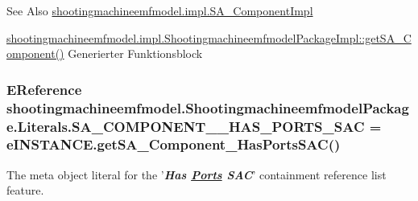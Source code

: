 \begin{DoxySeeAlso}{See Also}
\hyperlink{classshootingmachineemfmodel_1_1impl_1_1_s_a___component_impl}{shootingmachineemfmodel.\-impl.\-S\-A\-\_\-\-Component\-Impl} 

\hyperlink{classshootingmachineemfmodel_1_1impl_1_1_shootingmachineemfmodel_package_impl_a8ca2d4f6946a882d7676eef21e132f62}{shootingmachineemfmodel.\-impl.\-Shootingmachineemfmodel\-Package\-Impl\-::get\-S\-A\-\_\-\-Component()} Generierter Funktionsblock 
\end{DoxySeeAlso}
\hypertarget{interfaceshootingmachineemfmodel_1_1_shootingmachineemfmodel_package_1_1_literals_a84f344e1e40c66de4c0fab095b97b7ee}{
\subsubsection[{S\-A\-\_\-\-C\-O\-M\-P\-O\-N\-E\-N\-T\-\_\-\-\_\-\-H\-A\-S\-\_\-\-P\-O\-R\-T\-S\-\_\-\-S\-A\-C}]{\setlength{\rightskip}{0pt plus 5cm}E\-Reference shootingmachineemfmodel.\-Shootingmachineemfmodel\-Package.\-Literals.\-S\-A\-\_\-\-C\-O\-M\-P\-O\-N\-E\-N\-T\-\_\-\-\_\-\-H\-A\-S\-\_\-\-P\-O\-R\-T\-S\-\_\-\-S\-A\-C = e\-I\-N\-S\-T\-A\-N\-C\-E.\-get\-S\-A\-\_\-\-Component\-\_\-\-Has\-Ports\-S\-A\-C()}}\label{interfaceshootingmachineemfmodel_1_1_shootingmachineemfmodel_package_1_1_literals_a84f344e1e40c66de4c0fab095b97b7ee}
The meta object literal for the '{\itshape {\bfseries Has \hyperlink{interfaceshootingmachineemfmodel_1_1_ports}{Ports} S\-A\-C}}' containment reference list feature.

